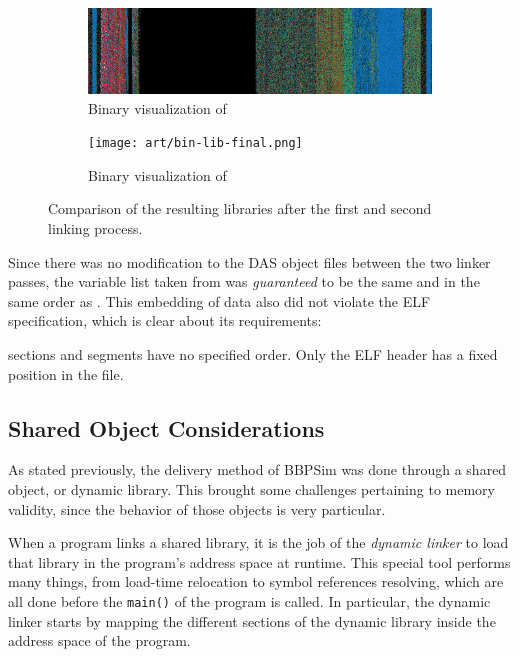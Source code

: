 {\begin{figure}[htbp]
	\centering
	\begin{subfigure}{\linewidth}
		\centering
		\includegraphics[width=\linewidth, keepaspectratio]{art/bin-lib-intermediate.png}
		\caption{Binary visualization of }
		\label{fig:bin-lib-intermediate}
	\end{subfigure}
	\vspace{12pt}
	\begin{subfigure}{\linewidth}
		\centering
		\texttt{[image: art/bin-lib-final.png]}
		\caption{Binary visualization of }
		\label{fig:bin-lib-final}
	\end{subfigure}
	\caption{Comparison of the resulting libraries after the first and second linking process.}
	\label{fig:bin-lib-comp}
\end{figure}

Since there was no modification to the DAS object files between the two linker passes, the variable list taken from  was \textit{guaranteed} to be the same and in the same order as . This embedding of data also did not violate the ELF specification, which is clear about its requirements:

\begin{shadedquotation}
[...] sections and segments have no specified order. Only the ELF header has a fixed position in the file.\cite{online:elf-spec}
\end{shadedquotation}

\subsection*{Shared Object Considerations}\label{subsec:shared-obj-considerations}
As stated previously, the delivery method of BBPSim was done through a shared object, or dynamic library. This brought some challenges pertaining to memory validity, since the behavior of those objects is very particular.

When a program links a shared library, it is the job of the \textit{dynamic linker} to load that library in the program's address space at runtime. This special tool performs many things, from load-time relocation to symbol references resolving\cite{online:elf-reloc}, which are all done before the \texttt{main()} of the program is called. In particular, the dynamic linker starts by mapping the different sections of the dynamic library inside the address space of the program. 

}
